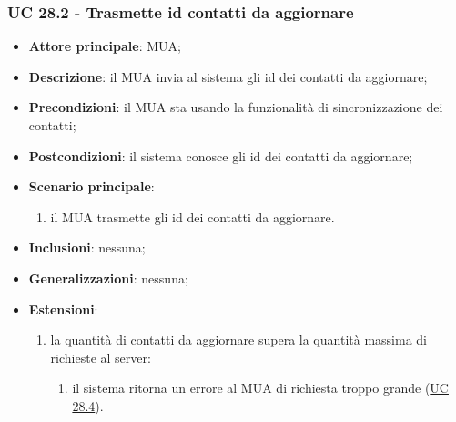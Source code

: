     \subsubsection{UC 28.2 - Trasmette id contatti da aggiornare} \label{sec:UC28.2}
    \begin{itemize}
        \item \textbf{Attore principale}: MUA;
        \item \textbf{Descrizione}: il MUA invia al sistema gli id dei contatti da aggiornare;
        \item \textbf{Precondizioni}: il MUA sta usando la funzionalità di sincronizzazione dei contatti;
        \item \textbf{Postcondizioni}: il sistema conosce gli id dei contatti da aggiornare;
        \item \textbf{Scenario principale}:
            \begin{enumerate}
                \item il MUA trasmette gli id dei contatti da aggiornare.
            \end{enumerate}
        \item \textbf{Inclusioni}: nessuna;
        \item \textbf{Generalizzazioni}: nessuna;
        \item \textbf{Estensioni}:
            \begin{enumerate}[label=\alph*.]
                \item la quantità di contatti da aggiornare supera la quantità massima di richieste al server:
                \begin{enumerate}[label=\arabic*.]
                    \item il sistema ritorna un errore al MUA di richiesta troppo grande (\hyperref[sec:UC28.4]{UC 28.4}).
                \end{enumerate}
            \end{enumerate}
    \end{itemize}


